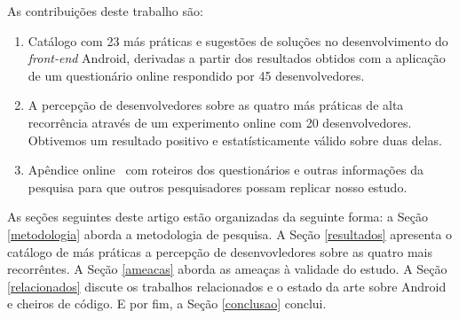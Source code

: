 
As contribuições deste trabalho são:

\begin{enumerate}

	\item Catálogo com 23 más práticas e sugestões de soluções no desenvolvimento do \textit{front-end} Android, derivadas a partir dos resultados obtidos com a aplicação de um questionário online respondido por 45 desenvolvedores.

	\item A percepção de desenvolvedores sobre as quatro más práticas de alta recorrência através de um experimento online com 20 desenvolvedores. Obtivemos um resultado positivo e estatísticamente válido sobre duas delas.

	\item Apêndice online~\cite{apendice} com roteiros dos questionários e outras informações da pesquisa para que outros pesquisadores possam replicar nosso estudo.

\end{enumerate}



As seções seguintes deste artigo estão organizadas da seguinte forma: a Seção \ref{metodologia} aborda a metodologia de pesquisa. A Seção \ref{resultados} apresenta o catálogo de más práticas a percepção de desenvovledores sobre as quatro mais recorrêntes. A Seção \ref{ameacas} aborda as ameaças à validade do estudo. A Seção \ref{relacionados} discute os trabalhos relacionados e o estado da arte sobre Android e cheiros de código. E por fim, a Seção \ref{conclusao} conclui.
